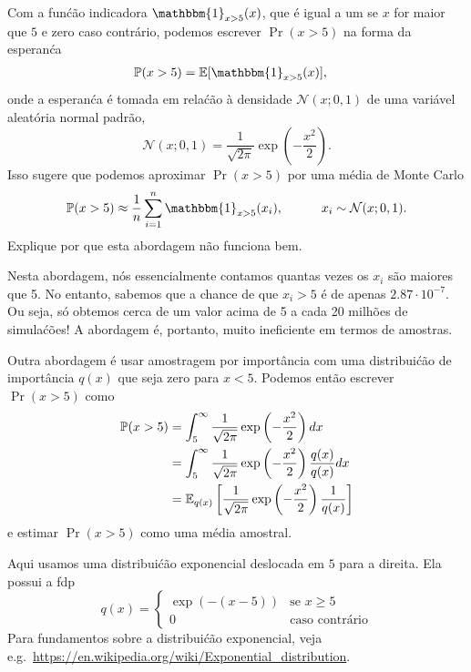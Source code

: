 \begin{exenumerate}
    \item Com a fun\'c\~ao indicadora $\mathbbm{1}_{x>5}(x)$, que
    \'e igual a um se $x$ for maior que $5$ e zero caso contr\'ario, podemos
    escrever $\Pr(x>5)$ na forma da esperan\'ca
    \begin{align}
        \Pr(x>5) &= \E[ \mathbbm{1}_{x>5}(x) ],
    \end{align}
    onde a esperan\'ca \'e tomada em rela\'c\~ao \`a densidade
    $\mathcal{N}(x; 0, 1)$ de uma vari\'avel aleat\'oria normal padr\~ao,
    \begin{equation}
        \mathcal{N}(x; 0, 1) = \frac{1}{\sqrt{2\pi}} \exp\left(-\frac{x^2}{2}\right).
    \end{equation}
    Isso sugere que podemos aproximar $\Pr(x>5)$ por uma m\'edia de Monte Carlo
    \begin{equation}
        \Pr(x>5) \approx \frac{1}{n} \sum_{i=1}^n \mathbbm{1}_{x>5}(x_i), \quad \quad \quad x_i \sim  \mathcal{N}(x; 0, 1).
    \end{equation}
    Explique por que esta abordagem n\~ao funciona bem.
    
    \begin{solution}
        Nesta abordagem, n\'os essencialmente contamos quantas vezes os $x_i$
        s\~ao maiores que 5. No entanto, sabemos que a chance de que $x_i>5$
        \'e de apenas $2.87 \cdot 10^{-7}$. Ou seja, s\'o obtemos cerca de um valor acima de 5
        a cada 20 milh\~oes de simula\'c\~oes! A abordagem \'e, portanto, muito ineficiente em termos de amostras.
    \end{solution}
    
    \item Outra abordagem \'e usar amostragem por import\^ancia com uma distribui\'c\~ao de import\^ancia $q(x)$ que seja zero para $x<5$. Podemos ent\~ao escrever $\Pr(x>5)$ como
    \begin{align}
        \mathbb{P}(x>5) & = \int_{5}^\infty \frac{1}{\sqrt{2\pi}} \exp\left(-\frac{x^2}{2}\right) dx\\
        & = \int_{5}^\infty \frac{1}{\sqrt{2\pi}} \exp\left(-\frac{x^2}{2}\right) \frac{q(x)}{q(x)} dx \\
        & = \mathbb{E}_{q(x)} \left[\frac{1}{\sqrt{2\pi}} \exp\left(-\frac{x^2}{2}\right) \frac{1}{q(x)}\right]
    \end{align}
    e estimar $\Pr(x>5)$ como uma m\'edia amostral.
    
    Aqui usamos uma distribui\'c\~ao exponencial deslocada em $5$ para a direita. Ela possui a fdp
    \begin{equation}
        q(x) = \begin{cases}
            \exp(- (x-5)) & \text{se } x\ge 5\\
            0 & \text{caso contr\'ario}
        \end{cases}
    \end{equation}
    Para fundamentos sobre a distribui\'c\~ao exponencial, veja
    e.g.\ \url{https://en.wikipedia.org/wiki/Exponential_distribution}.
    

\end{exenumerate}
